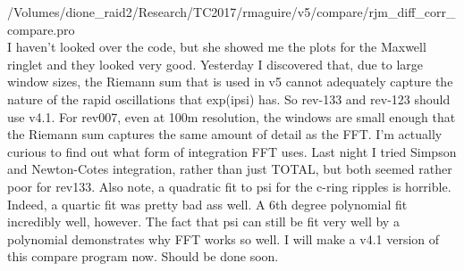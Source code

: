 \documentclass[crop=false,class=book]{standalone}
\begin{document}
/Volumes/dione\_raid2/Research/TC2017/rmaguire/v5/compare/rjm\_diff\_corr\_compare.pro\\
I haven't looked over the code, but she showed me the plots for the Maxwell ringlet and they looked very good. Yesterday I discovered that, due to large window sizes, the Riemann sum that is used in v5 cannot adequately capture the nature of the rapid oscillations that exp(ipsi) has. So rev-133 and rev-123 should use v4.1. For rev007, even at 100m resolution, the windows are small enough that the Riemann sum captures the same amount of detail as the FFT. I'm actually curious to find out what form of integration FFT uses. Last night I tried Simpson and Newton-Cotes integration, rather than just TOTAL, but both seemed rather poor for rev133. Also note, a quadratic fit to psi for the c-ring ripples is horrible. Indeed, a quartic fit was pretty bad ass well. A 6th degree polynomial fit incredibly well, however. The fact that psi can still be fit very well by a polynomial demonstrates why FFT works so well. I will make a v4.1 version of this compare program now. Should be done soon.
\end{document}

